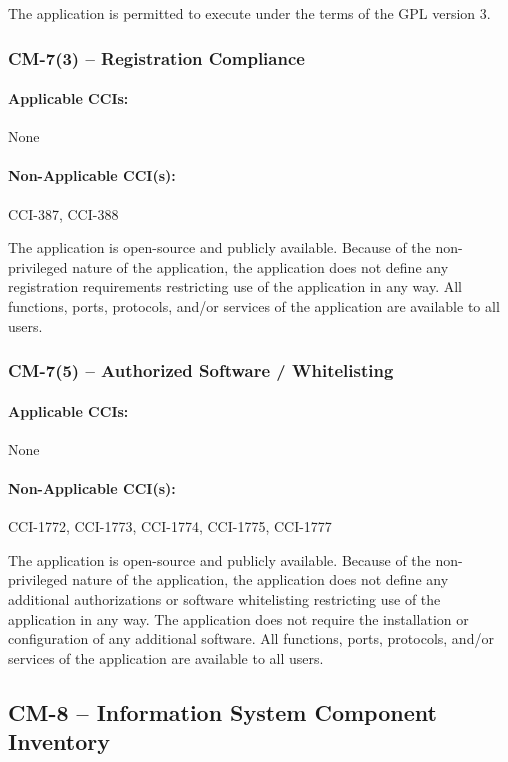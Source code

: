 \documentclass[letterpaper, 10pt, twoside]{article}
\begin{document}
The application is permitted to execute under the terms of the GPL version 3.

\subsubsection{CM-7(3) -- Registration Compliance}

\paragraph{Applicable CCIs:} None

\paragraph{Non-Applicable CCI(s):} CCI-387, CCI-388

The application is open-source and publicly available. Because of the non-privileged nature of the application, the application does not define any registration requirements restricting use of the application in any way. All functions, ports, protocols, and/or services of the application are available to all users.

\subsubsection{CM-7(5) -- Authorized Software / Whitelisting}

\paragraph{Applicable CCIs:} None

\paragraph{Non-Applicable CCI(s):} CCI-1772, CCI-1773, CCI-1774, CCI-1775, CCI-1777

The application is open-source and publicly available. Because of the non-privileged nature of the application, the application does not define any additional authorizations or software whitelisting restricting use of the application in any way. The application does not require the installation or configuration of any additional software. All functions, ports, protocols, and/or services of the application are available to all users.

\subsection{CM-8 -- Information System Component Inventory}
\end{document}
